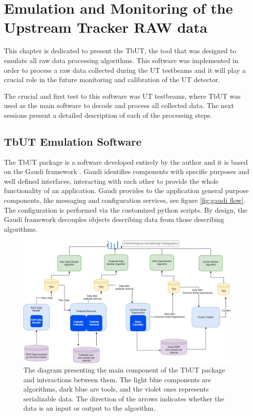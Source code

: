 \chapter{Emulation and Monitoring of the Upstream Tracker RAW data}

This chapter is dedicated to present the TbUT, the tool that was designed to emulate all raw data processing algorithms. This software was implemented in order to process a raw data collected during the UT testbeams and it will play a crucial role in the future monitoring and calibration of the UT detector. 

The crucial and first test to this software was UT testbeams, where TbUT was used as the main software to decode and process all collected data. The next sessions present a detailed description of each of the processing steps.


\section{TbUT Emulation Software}

The TbUT package is a software developed entirely by the author and it is based on the Gaudi framework \cite{Gaudi}. Gaudi identifies components with specific purposes and well defined interfaces, interacting with each other to provide the whole functionality of an application. Gaudi provides to the application general purpose components, like messaging and configuration services, see figure \ref{fig:gaudi flow}. The configuration is performed via the customized python scripts. By design, the Gaudi framework decouples objects describing data from those describing algorithms.



\begin{figure}[h]
\centering
\includegraphics{figures/TBUT.png}
\caption{The diagram presenting the main component of the TbUT package and interactions between them. The light blue components are algorithms, dark blue are tools, and the violet ones represents serializable data. The direction of the arrows indicates whether the data is an input or output to the algorithm. }
\label{fig:TbUT}
\end{figure}

